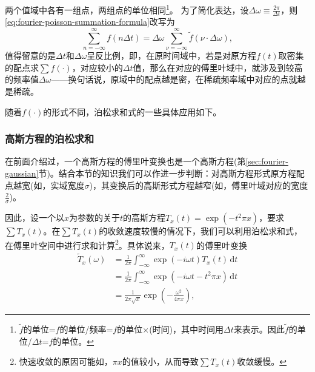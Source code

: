 两个值域中各有一组点，两组点的单位相同\footnote{
$\tilde{f}$的单位=$f$的单位/频率=$f$的单位$\times$(时间)，其中时间用$\Delta t$来表示。因此$\tilde{f}$的单位/$\Delta t$=$f$的单位。}。
为了简化表达，设$\Delta \omega \equiv \frac{2 \pi}{\Delta t}$，则\eqref{eq:fourier-poisson-summation-formula}改写为
\begin{equation}
  \label{eq:fourier-poisson-summation-formula-simp}
  \sum_{n = - \infty}^{\infty} f \left( n \Delta t \right)
  = \Delta \omega \sum_{\nu = - \infty}^{\infty}
  \tilde{f} \left( \nu \cdot \Delta \omega \right),
\end{equation}
值得留意的是$\Delta t$和$\Delta \omega$呈反比例，即，在原时间域中，若是对原方程$f(t)$取密集的配点求$\sum f(\cdot)$，对应较小的$\Delta t$值，那么在对应的傅里叶域中，就涉及到较高的频率值$\Delta \omega$——换句话说，原域中的配点越是密，在稀疏频率域中对应的点就越是稀疏。

随着$f(\cdot)$的形式不同，泊松求和式的一些具体应用如下。

\subsubsection{高斯方程的泊松求和}
\label{eq:fourier-poisson-gaussian}

在前面介绍过，一个高斯方程的傅里叶变换也是一个高斯方程(第\ref{sec:fourier-gaussian}节)。结合本节的知识我们可以作进一步判断：对高斯方程形式原方程配点越宽(如，实域宽度$\sigma$)，其变换后的高斯形式方程越窄(如，傅里叶域对应的宽度$\frac{2}{\sigma}$)。

因此，设一个以$x$为参数的关于$t$的高斯方程$ T_{x}(t)=\exp \left( - t^{2} \pi x \right)$，要求$\sum T_{x}(t)$。在$\sum T_{x}(t)$的收敛速度较慢的情况下，我们可以利用泊松求和式，在傅里叶空间中进行求和计算\footnote{快速收敛的原因可能如，$\pi x$的值较小，从而导致$\sum T_{x}(t)$收敛缓慢。}。具体说来，$T_{x}(t)$的傅里叶变换
\begin{equation*}
  \begin{split}
    \widetilde{T}_{x} \left( \omega \right)
    & = \frac{1}{2 \pi} \int_{-\infty}^{\infty} \exp \left( - i \omega t \right) T_{x}(t) \, \mathrm{d} t \\
    & = \frac{1}{2 \pi} \int_{-\infty}^{\infty}
    \exp \left( - i \omega t - t^{2} \pi x \right)  \, \mathrm{d} t \\
    & = \frac{1}{2 \pi \sqrt{x}}
    \exp \left(
    - \frac{\omega^{2}}{4 \pi x}
    \right),
  \end{split}
\end{equation*}

